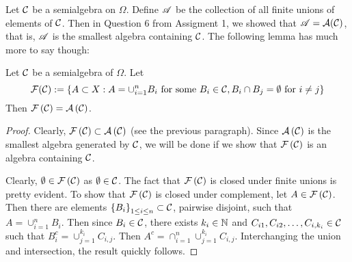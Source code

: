 Let ${\cal C}$ be a semialgebra on $\Omega$. Define ${\mathscr A}$ be the collection of all finite unions of elements of ${\cal C}$. Then in Question 6 from Assigment 1, we showed that ${\mathscr A} = {\cal A} ({\cal C})$, that is, ${\mathscr A}$ is the smallest algebra containing ${\cal C}$.
The following lemma has much more to say though:

\begin{lemma}
Let ${\cal C}$ be a semialgebra of $\Omega$. Let $${\cal F} ({\cal C}) := \left\{ A \subset X: A= \cup_{i=1}^{n} B_i \text{ for some } B_i \in {\cal C}, B_i \cap B_j = \emptyset \text{ for } i\ne j\right\}$$
Then ${\cal F} \left( {\cal C} \right) = {\cal A} \left( {\cal C} \right)$.
    \label{lemma:disjoint-algebra-generated}
\end{lemma}
\begin{proof}
    Clearly, ${\cal F} \left( {\cal C} \right) \subset {\cal A} \left( {\cal C} \right)$ (see the previous paragraph). Since ${\cal A} \left( {\cal C} \right)$ is the smallest algebra generated by ${\cal C}$, we will be done if we show that ${\cal F} \left( {\cal C} \right)$ is an algebra containing ${\cal C}$. 

    Clearly, $\emptyset \in {\cal F} \left( {\cal C} \right)$ as $\emptyset \in {\cal C}$. The fact that ${\cal F} \left( {\cal C} \right)$ is closed under finite unions is pretty evident. To show that ${\cal F} \left( {\cal C} \right)$ is closed under complement, let $A\in {\cal F} \left( {\cal C} \right)$. Then there are elements $\left\{ B_i \right\}_{1\le i \le n} \subset {\cal C}$, pairwise disjoint, such that $A=\cup_{i=1}^{n} B_i$. Then since $B_i \in {\cal C}$, there exists $k_i \in \mathbb N$ and $C_{i1} , C_{i2} , \ldots , C_{i,k_i} \in {\cal C}$ such that $B_i ^c = \cup_{j=1}^{k_i} C_{i,j}$. Then $A^c=\cap_{i=1}^{n} \cup_{j=1}^{k_i} C_{i,j}$. Interchanging the union and intersection, the result quickly follows.
\end{proof}

